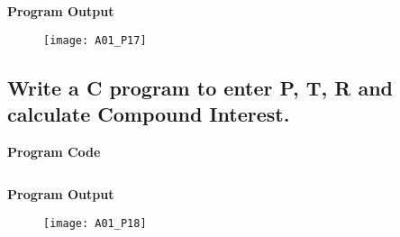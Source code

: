 \inputminted{C}{programs/A01_P17.c}

\textbf{Program Output}

\begin{figure}[h]
  \texttt{[image: A01\_P17]}
\end{figure}

\newpage



\subsection{Write a C program to enter P, T, R and calculate Compound Interest.}
\textbf{Program Code}

\inputminted{C}{programs/A01_P18.c}

\textbf{Program Output}

\begin{figure}[h]
  \texttt{[image: A01\_P18]}
\end{figure}

\newpage


